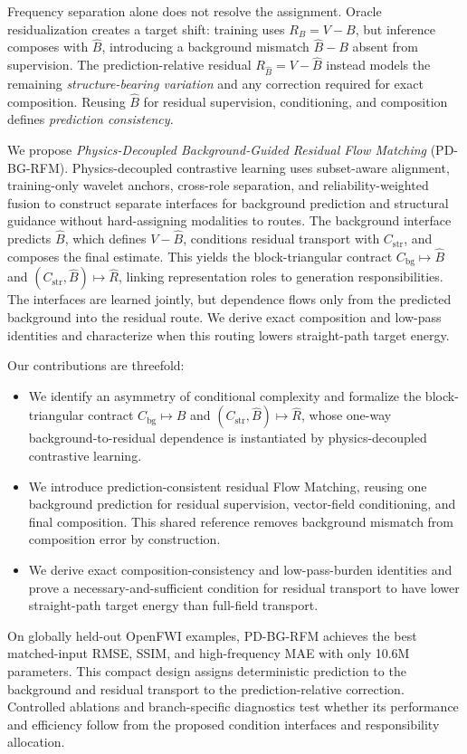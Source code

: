 Frequency separation alone does not resolve the assignment. Oracle residualization creates a target shift: training uses $R_B=V-B$, but inference composes with $\hat B$, introducing a background mismatch $\hat B-B$ absent from supervision. The prediction-relative residual $R_{\hat B}=V-\hat B$ instead models the remaining \emph{structure-bearing variation} and any correction required for exact composition. Reusing $\hat B$ for residual supervision, conditioning, and composition defines \emph{prediction consistency}.

We propose \emph{Physics-Decoupled Background-Guided Residual Flow Matching} (PD-BG-RFM). Physics-decoupled contrastive learning uses subset-aware alignment, training-only wavelet anchors, cross-role separation, and reliability-weighted fusion to construct separate interfaces for background prediction and structural guidance without hard-assigning modalities to routes. The background interface predicts $\hat B$, which defines $V-\hat B$, conditions residual transport with $C_{\mathrm{str}}$, and composes the final estimate. This yields the block-triangular contract $C_{\mathrm{bg}}\mapsto\hat B$ and $(C_{\mathrm{str}},\hat B)\mapsto\hat R$, linking representation roles to generation responsibilities. The interfaces are learned jointly, but dependence flows only from the predicted background into the residual route. We derive exact composition and low-pass identities and characterize when this routing lowers straight-path target energy.

Our contributions are threefold:
\begin{itemize}
\item We identify an asymmetry of conditional complexity and formalize the block-triangular contract $C_{\mathrm{bg}}\mapsto\hat B$ and $(C_{\mathrm{str}},\hat B)\mapsto\hat R$, whose one-way background-to-residual dependence is instantiated by physics-decoupled contrastive learning.
\item We introduce prediction-consistent residual Flow Matching, reusing one background prediction for residual supervision, vector-field conditioning, and final composition. This shared reference removes background mismatch from composition error by construction.
\item We derive exact composition-consistency and low-pass-burden identities and prove a necessary-and-sufficient condition for residual transport to have lower straight-path target energy than full-field transport.
\end{itemize}
On globally held-out OpenFWI examples, PD-BG-RFM achieves the best matched-input RMSE, SSIM, and high-frequency MAE with only 10.6M parameters. This compact design assigns deterministic prediction to the background and residual transport to the prediction-relative correction. Controlled ablations and branch-specific diagnostics test whether its performance and efficiency follow from the proposed condition interfaces and responsibility allocation.

